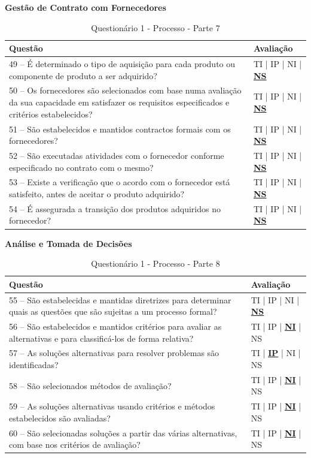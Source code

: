 \documentclass[openany,10pt,a4paper]{article}
\begin{document}
\begin{appendix}
	\begin{table}[h]
	\textbf{Gestão de Contrato com Fornecedores}
		\centering
		\caption{Questionário 1 - Processo - Parte 7}
		\begin{tabular}{p{5in}p{1in}}		
			\toprule
			\textbf{Questão}  & \textbf{Avaliação}\\ 
			\midrule
			49 – É determinado o tipo de aquisição para cada produto ou componente de produto a ser 
	adquirido?
	 & TI | IP | NI | \underline{\textbf{NS}} \\
			\midrule
			50 – Os fornecedores são selecionados com base numa avaliação da sua capacidade em 
	satisfazer os requisitos especificados e critérios estabelecidos?
	 & TI | IP | NI | \underline{\textbf{NS}} \\
			\midrule
			51 – São estabelecidos e mantidos contractos formais com os fornecedores?
	 & TI | IP | NI | \underline{\textbf{NS}} \\
			\midrule
			52 – São executadas atividades com o fornecedor conforme especificado no contrato com o 
	mesmo?
	 & TI | IP | NI | \underline{\textbf{NS}} \\
			\midrule
			53 – Existe a verificação que o acordo com o fornecedor está satisfeito, antes de aceitar o 
	produto adquirido?
	  & TI | IP | NI | \underline{\textbf{NS}} \\
			\midrule
			54 – É assegurada a transição dos produtos adquiridos no fornecedor?
	 & TI | IP | NI | \underline{\textbf{NS}} \\
			\bottomrule
		\end{tabular} 
	\end{table}
	
	\begin{table}[h]
	\textbf{Análise e Tomada de Decisões}
		\centering
		\caption{Questionário 1 - Processo - Parte 8}
		\begin{tabular}{p{5in}p{1in}}		
			\toprule
			\textbf{Questão}  & \textbf{Avaliação}\\ 
			\midrule
			55 – São estabelecidas e mantidas diretrizes para determinar quais as questões que são sujeitas 
	a um processo formal?
	 & TI | IP | NI | \underline{\textbf{NS}} \\
			\midrule
			56 – São estabelecidos e mantidos critérios para avaliar as alternativas e para classificá-los de 
	forma relativa?
	 & TI | IP | \underline{\textbf{NI}} | NS \\
			\midrule
			57 – As soluções alternativas para resolver problemas são identificadas?
	 & TI | \underline{\textbf{IP}} | NI | NS \\
			\midrule
			58 – São selecionados métodos de avaliação?
	 & TI | IP | \underline{\textbf{NI}} | NS \\
			\midrule
			59 – As soluções alternativas usando critérios e métodos estabelecidos são avaliadas?
	  & TI | IP | \underline{\textbf{NI}} | NS \\
			\midrule
			60 – São selecionadas soluções a partir das várias alternativas, com base nos critérios de 
	avaliação?
	 & TI | IP | \underline{\textbf{NI}} | NS \\
			\bottomrule
		\end{tabular} 
	\end{table}
	

\end{appendix}
\end{document}
